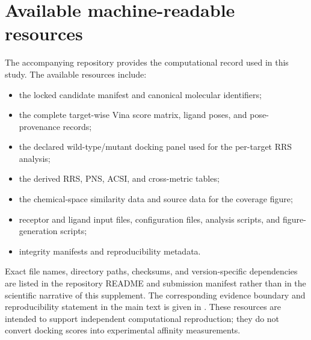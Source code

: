 \documentclass[journal=jcisd8,manuscript=suppinfo]{achemso}
\begin{document}
\section{Available machine-readable resources}\label{sec:sm_resources}
The accompanying repository provides the computational record used in this study. The available resources include:
\begin{itemize}
    \item the locked candidate manifest and canonical molecular identifiers;
    \item the complete target-wise Vina score matrix, ligand poses, and pose-provenance records;
    \item the declared wild-type/mutant docking panel used for the per-target RRS analysis;
    \item the derived RRS, PNS, ACSI, and cross-metric tables;
    \item the chemical-space similarity data and source data for the coverage figure;
    \item receptor and ligand input files, configuration files, analysis scripts, and figure-generation scripts;
    \item integrity manifests and reproducibility metadata.
\end{itemize}
Exact file names, directory paths, checksums, and version-specific dependencies are listed in the repository README and submission manifest rather than in the scientific narrative of this supplement. The corresponding evidence boundary and reproducibility statement in the main text is given in . These resources are intended to support independent computational reproduction; they do not convert docking scores into experimental affinity measurements.


\end{document}

